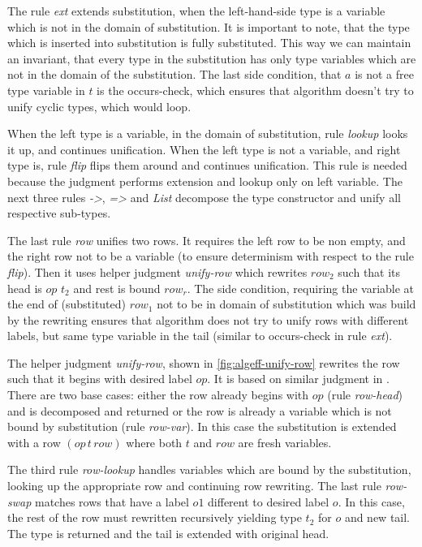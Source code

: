 \documentclass[inz, english, shortabstract]{iithesis}
\begin{document}
The rule \emph{ext} extends substitution, when the left-hand-side type is a variable which is not in the domain of substitution.
It is important to note, that the type which is inserted into substitution is fully substituted.
This way we can maintain an invariant, that every type in the substitution has only type variables which are not in the domain of the substitution.
The last side condition, that $a$ is not a free type variable in $t$ is the occurs-check, which ensures that algorithm doesn't try to unify cyclic types, which would loop.

When the left type is a variable, in the domain of substitution, rule \emph{lookup} looks it up, and continues unification.
When the left type is not a variable, and right type is, rule \emph{flip} flips them around and continues unification.
This rule is needed because the judgment performs extension and lookup only on left variable.
The next three rules \emph{->}, \emph{=>} and \emph{List} decompose the type constructor and unify all respective sub-types.

The last rule \emph{row} unifies two rows.
It requires the left row to be non empty, and the right row not to be a variable (to ensure determinism with respect to the rule \emph{flip}).
Then it uses helper judgment \emph{unify-row} which rewrites $row_2$ such that its head is $op \, \, t_2$ and rest is bound $row_r$.
The side condition, requiring the variable at the end of (substituted) $row_1$ not to be in domain of substitution which was build by the rewriting ensures that algorithm does not try to unify rows with different labels, but same type variable in the tail (similar to occurs-check in rule \emph{ext}).

The helper judgment \emph{unify-row}, shown in \autoref{fig:algeff-unify-row} rewrites the row such that it begins with desired label $op$.
It is based on similar judgment in \cite{Leijen2005}.
There are two base cases: either the row already begins with $op$ (rule \emph{row-head}) and is decomposed and returned or the row is already a variable which is not bound by substitution (rule \emph{row-var}).
In this case the substitution is extended with a row $(op \, t \, row)$ where both $t$ and $row$ are fresh variables.

The third rule \emph{row-lookup} handles variables which are bound by the substitution, looking up the appropriate row and continuing row rewriting.
The last rule \emph{row-swap} matches rows that have a label $o1$ different to desired label $o$.
In this case, the rest of the row must rewritten recursively yielding type $t_2$ for $o$ and new tail.
The type is returned and the tail is extended with original head.
\end{document}
